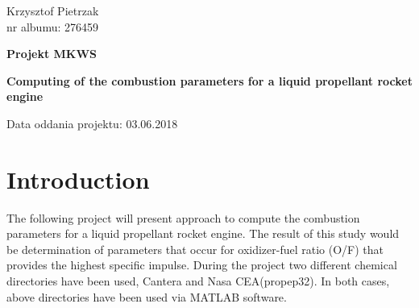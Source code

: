 \documentclass[11pt]{article}
\begin{document}
\thispagestyle{empty}
\begin{flushright}
Krzysztof Pietrzak\\
nr albumu: 276459\\
\end{flushright}
\bigskip \bigskip \bigskip \bigskip \bigskip \bigskip \bigskip \bigskip 
\bigskip \bigskip \bigskip \bigskip \bigskip \bigskip 
\begin{center}
\textbf{\Huge{Projekt MKWS}}\\
\end{center}
\bigskip
\begin{center}
\textbf{\Huge{Computing of the combustion parameters for a liquid propellant rocket engine}}
\end{center}
\begin{flushright}
\vspace*{\fill}
Data oddania projektu: 03.06.2018
\end{flushright}
\newpage
\pagestyle{fancy}
\fancyhead{}
\fancyfoot{}
\fancyfoot[R]{\thepage}
\setcounter{page}{1}
\section{Introduction}
The following project will present approach to compute the combustion parameters for a liquid propellant rocket engine. The result of this study would be determination of parameters that occur for oxidizer-fuel ratio (O/F) that provides the highest specific impulse. During the project two different chemical directories have been used, Cantera and Nasa CEA(propep32). In both cases, above directories have been used via MATLAB software. 
\end{document}
